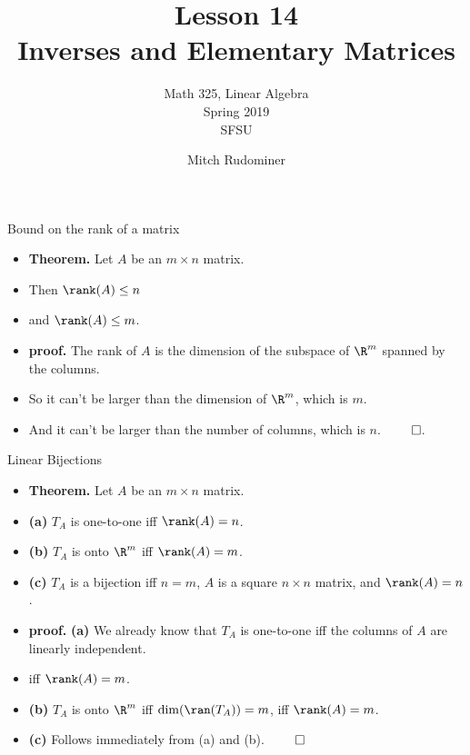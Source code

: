 \documentclass{beamer}
\title{Lesson 14 \\ Inverses and Elementary Matrices}
\subtitle{Math 325, Linear Algebra \\ Spring 2019 \\ SFSU}
\author{Mitch Rudominer}
\date{}
\begin{document}
\begin{frame}
  \titlepage
\end{frame}


\begin{frame}{Bound on the rank of a matrix}

\begin{itemize}
\item \textbf{Theorem.} Let $A$ be an $m\times n$ matrix.
\item Then $\rank(A) \leq n$
\item and $\rank(A) \leq m$.
\item \textbf{proof.} The rank of $A$ is the dimension of the subspace
of $\R^m$  spanned by the columns.
\item So it can't be larger than the dimension of $\R^m$, which is $m$.
\item And it can't be larger than the number of columns, which is $n$. $\qed$.
\end{itemize}
\end{frame}


\begin{frame}{Linear Bijections}

\begin{itemize}
\item \textbf{Theorem.} Let $A$ be an $m\times n$ matrix.
\item \textbf{(a)} $T_A$ is one-to-one iff $\rank(A) = n$.
\item \textbf{(b)} $T_A$ is onto $\R^m$ iff $\rank(A) = m$.
\item \textbf{(c)} $T_A$ is a bijection iff $n=m$, $A$ is a square $n\times n$ matrix, and $\rank(A) = n$.
\item \textbf{proof.} \textbf{(a)} We already know that $T_A$ is one-to-one iff the
columns of $A$ are linearly independent.
\item iff $\rank(A) = m$.
\item \textbf{(b)} $T_A$ is onto $\R^m$ iff $\dim(\ran(T_A)) = m$, iff $\rank(A) = m$.
\item \textbf{(c)} Follows immediately from (a) and (b). $\qed$
\end{itemize}
\end{frame}

\end{document}
